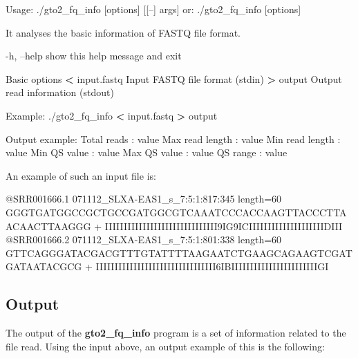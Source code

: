 \documentclass[11pt,]{krantz}
\newenvironment{Shaded}{\begin{snugshade}}{\end{snugshade}}
\newcommand{\OperatorTok}[1]{\textcolor[rgb]{0.43,0.43,0.43}{\textbf{#1}}}
\newcommand{\ExtensionTok}[1]{#1}
\newcommand{\NormalTok}[1]{#1}
\begin{document}
\begin{Shaded}
\begin{Highlighting}[]
\ExtensionTok{Usage}\NormalTok{: ./gto2_fq_info [options] [[--] args]}
   \ExtensionTok{or}\NormalTok{: ./gto2_fq_info [options]}

\ExtensionTok{It}\NormalTok{ analyses the basic information of FASTQ file format.}

    \ExtensionTok{-h}\NormalTok{, --help            show this help message and exit}

\ExtensionTok{Basic}\NormalTok{ options}
    \OperatorTok{<} \ExtensionTok{input.fastq}\NormalTok{         Input FASTQ file format (stdin)}
    \OperatorTok{>} \ExtensionTok{output}\NormalTok{              Output read information (stdout)}

\ExtensionTok{Example}\NormalTok{: ./gto2_fq_info }\OperatorTok{<}\NormalTok{ input.fastq }\OperatorTok{>}\NormalTok{ output}

\ExtensionTok{Output}\NormalTok{ example:}
\ExtensionTok{Total}\NormalTok{ reads     : value}
\ExtensionTok{Max}\NormalTok{ read length : value}
\ExtensionTok{Min}\NormalTok{ read length : value}
\ExtensionTok{Min}\NormalTok{ QS value    : value}
\ExtensionTok{Max}\NormalTok{ QS value    : value}
\ExtensionTok{QS}\NormalTok{ range        : value}
\end{Highlighting}
\end{Shaded}

An example of such an input file is:

\begin{Shaded}
\begin{Highlighting}[]
\ExtensionTok{@SRR001666.1}\NormalTok{ 071112_SLXA-EAS1_s_7:5:1:817:345 length=60}
\ExtensionTok{GGGTGATGGCCGCTGCCGATGGCGTCAAATCCCACCAAGTTACCCTTAACAACTTAAGGG}
\ExtensionTok{+}
\ExtensionTok{IIIIIIIIIIIIIIIIIIIIIIIIIIIIII9IG9ICIIIIIIIIIIIIIIIIIIIIDIII}
\ExtensionTok{@SRR001666.2}\NormalTok{ 071112_SLXA-EAS1_s_7:5:1:801:338 length=60}
\ExtensionTok{GTTCAGGGATACGACGTTTGTATTTTAAGAATCTGAAGCAGAAGTCGATGATAATACGCG}
\ExtensionTok{+}
\ExtensionTok{IIIIIIIIIIIIIIIIIIIIIIIIIIIIIIII6IBIIIIIIIIIIIIIIIIIIIIIIIGI}
\end{Highlighting}
\end{Shaded}

\subsection*{Output}\label{output-4}


The output of the \textbf{gto2\_fq\_info} program is a set of
information related to the file read. Using the input above, an output
example of this is the following:
\end{document}
